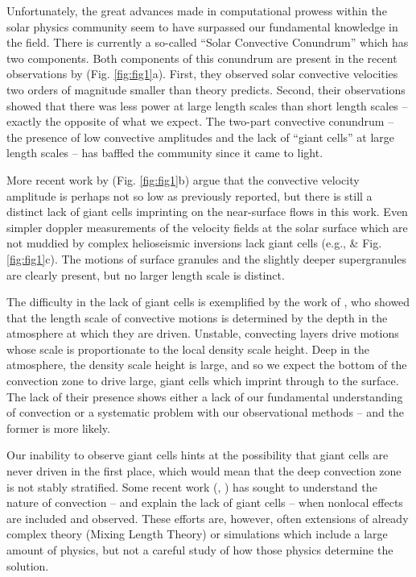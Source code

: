 \documentclass[aasms,12pt]{article}
\begin{document}
Unfortunately, the great advances made in computational prowess within the solar physics
community seem to have surpassed our fundamental knowledge in the field. There is currently
a so-called ``Solar Convective Conundrum'' which has two components.  Both components of
this conundrum are present in the recent observations
by \cite{hanasoge&all2012} (Fig. \ref{fig:fig1}a).  First, they observed solar convective velocities 
two orders of magnitude smaller than theory predicts. Second, their observations showed that there
was less power at large length scales than short length scales -- exactly the opposite of what
we expect.
The two-part convective conundrum -- the presence of low convective amplitudes
and the lack of ``giant cells'' at large length scales -- has baffled the community since it
came to light.

More recent work by \cite{greer&all2015} (Fig. \ref{fig:fig1}b) argue that the convective
velocity amplitude is perhaps not so low as previously reported, but there is still a distinct
lack of giant cells imprinting on the near-surface flows in this work.
Even simpler doppler measurements of the velocity fields at the solar surface which are not muddied
by complex helioseismic inversions lack
giant cells (e.g., \cite{hathaway&all2015} \& Fig. \ref{fig:fig1}c).  
The motions of surface granules and the slightly deeper supergranules are clearly present, but no
larger length scale is distinct.

The difficulty in the lack of giant cells is exemplified by the work of \cite{lord&all2014}, who showed that 
the length scale of convective motions is determined by the depth in the atmosphere at which they are driven.
Unstable, convecting layers drive motions whose scale is proportionate to
the local density scale height.  Deep in the atmosphere, the density scale height is large, and so we expect
the bottom of the convection zone to drive large, giant cells which imprint through to the surface.
The lack of their presence shows either a lack of our fundamental understanding of convection or
a systematic problem with our observational methods -- and the former is more likely.

Our inability to observe giant cells hints at the possibility that giant cells are never driven in the first place,
which would mean that the deep convection zone is not stably stratified. Some recent work
(\cite{brandenburg2016}, \cite{kapyla&all2017}) has sought to understand the nature of convection
-- and explain the lack of giant cells -- when nonlocal effects are included and observed.  
These efforts are, however, often extensions of already complex theory (Mixing Length Theory) or
simulations which include a large amount of physics, but not a careful study of how those physics
determine the solution.
\end{document}
